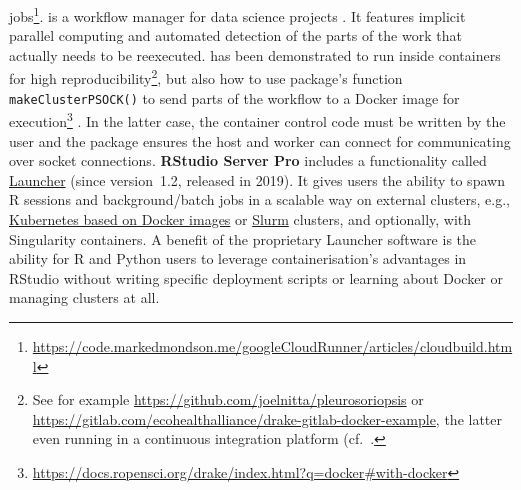 jobs\footnote{\href{https://code.markedmondson.me/googleCloudRunner/articles/cloudbuild.html}{https://code.markedmondson.me/googleCloudRunner/articles/cloudbuild.html}}.
\label{drake} \textbf{} is a workflow manager for data
science projects \citep{landau_drake_2019}. It features implicit
parallel computing and automated detection of the parts of the work that
actually needs to be reexecuted.  has been demonstrated
to run inside containers for high
reproducibility\footnote{See for example \href{https://github.com/joelnitta/pleurosoriopsis}{https://github.com/joelnitta/pleurosoriopsis} or \href{https://gitlab.com/ecohealthalliance/drake-gitlab-docker-example}{https://gitlab.com/ecohealthalliance/drake-gitlab-docker-example}, the latter even running in a continuous integration platform (cf.~.},
but also how to use  package's function
\texttt{makeClusterPSOCK()} to send parts of the workflow to a Docker
image for
execution\footnote{\href{https://docs.ropensci.org/drake/index.html?q=docker\#with-docker}{https://docs.ropensci.org/drake/index.html?q=docker\#with-docker}}
\citep[see package's function documentation;~][]{future_2020}. In the
latter case, the container control code must be written by the user and
the  package ensures the host and worker can connect for
communicating over socket connections. \textbf{RStudio Server Pro}
includes a functionality called
\href{https://solutions.rstudio.com/launcher/overview/}{Launcher} (since
version~1.2, released in 2019). It gives users the ability to spawn R
sessions and background/batch jobs in a scalable way on external
clusters, e.g.,
\href{https://support.rstudio.com/hc/en-us/articles/360019253393-Using-Docker-images-with-RStudio-Server-Pro-Launcher-and-Kubernetes}{Kubernetes
based on Docker images} or \href{https://slurm.schedmd.com/}{Slurm}
clusters, and optionally, with Singularity containers. A benefit of the
proprietary Launcher software is the ability for R and Python users to
leverage containerisation's advantages in RStudio without writing
specific deployment scripts or learning about Docker or managing
clusters at all.

